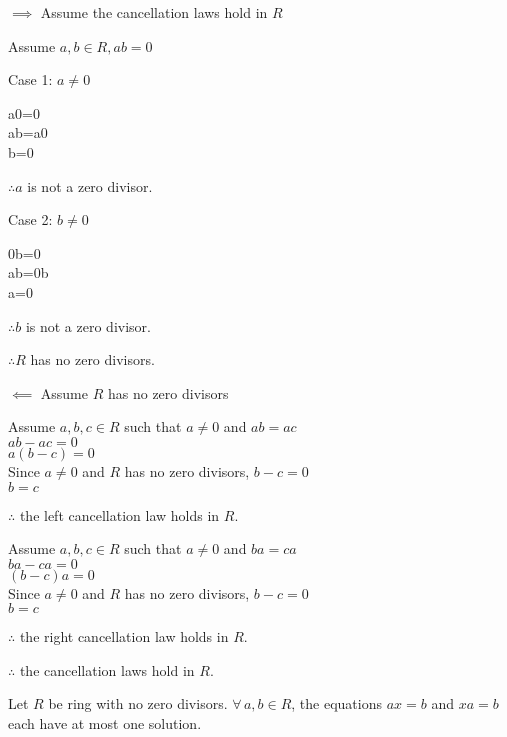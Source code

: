 \documentclass[letterpaper,12pt,fleqn]{article}
\begin{document}
\begin{theproof}
  \listbreak
  \begin{description}
  \item $\implies$ Assume the cancellation laws hold in $R$

    Assume $a,b\in R,ab=0$
    \begin{description}
      \begin{minipage}[t]{3in}
      \item Case 1: $a\ne0$

        a0=0 \\
        ab=a0 \\
        b=0

        $\therefore a$ is not a zero divisor.
      \end{minipage}
      \begin{minipage}[t]{3in}
      \item Case 2: $b\ne0$

        0b=0 \\
        ab=0b \\
        a=0

        $\therefore b$ is not a zero divisor.
      \end{minipage}
    \end{description}

    $\therefore R$ has no zero divisors.
    
  \item $\impliedby$ Assume $R$ has no zero divisors

    Assume $a,b,c\in R$ such that $a\ne0$ and $ab=ac$ \\
    $ab-ac=0$ \\
    $a(b-c)=0$ \\
    Since $a\ne0$ and $R$ has no zero divisors, $b-c=0$ \\
    $b=c$

    $\therefore$ the left cancellation law holds in $R$.

    Assume $a,b,c\in R$ such that $a\ne0$ and $ba=ca$ \\
    $ba-ca=0$ \\
    $(b-c)a=0$ \\
    Since $a\ne0$ and $R$ has no zero divisors, $b-c=0$ \\
    $b=c$

    $\therefore$ the right cancellation law holds in $R$.

    $\therefore$ the cancellation laws hold in $R$.
  \end{description}
\end{theproof}
\newpage
\begin{theorem}
  Let $R$ be ring with no zero divisors. $\forall\,a,b\in R$, the equations $ax=b$ and
  $xa=b$ each have at most one solution.
\end{theorem}
\end{document}
